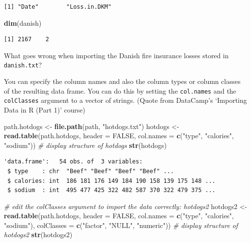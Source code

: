 \documentclass[
]{book}
\newenvironment{Shaded}{\begin{snugshade}}{\end{snugshade}}
\newcommand{\CommentTok}[1]{\textcolor[rgb]{0.56,0.35,0.01}{\textit{#1}}}
\newcommand{\DataTypeTok}[1]{\textcolor[rgb]{0.13,0.29,0.53}{#1}}
\newcommand{\KeywordTok}[1]{\textcolor[rgb]{0.13,0.29,0.53}{\textbf{#1}}}
\newcommand{\NormalTok}[1]{#1}
\newcommand{\OtherTok}[1]{\textcolor[rgb]{0.56,0.35,0.01}{#1}}
\newcommand{\StringTok}[1]{\textcolor[rgb]{0.31,0.60,0.02}{#1}}
\begin{document}
\begin{verbatim}
[1] "Date"        "Loss.in.DKM"
\end{verbatim}

\begin{Shaded}
\begin{Highlighting}[]
\KeywordTok{dim}\NormalTok{(danish)}
\end{Highlighting}
\end{Shaded}

\begin{verbatim}
[1] 2167    2
\end{verbatim}

What goes wrong when importing the Danish fire insurance losses stored in \texttt{danish.txt}?

You can specify the column names and also the column types or column classes of the resulting data frame. You can do this by setting the \texttt{col.names} and the \texttt{colClasses} argument to a vector of strings. (Quote from DataCamp's `Importing Data in R (Part 1)' course)

\begin{Shaded}
\begin{Highlighting}[]
\NormalTok{path.hotdogs <-}\StringTok{ }\KeywordTok{file.path}\NormalTok{(path, }\StringTok{"hotdogs.txt"}\NormalTok{)}
\NormalTok{hotdogs <-}\StringTok{ }\KeywordTok{read.table}\NormalTok{(path.hotdogs, }\DataTypeTok{header =} \OtherTok{FALSE}\NormalTok{, }\DataTypeTok{col.names =} \KeywordTok{c}\NormalTok{(}\StringTok{"type"}\NormalTok{, }\StringTok{"calories"}\NormalTok{, }\StringTok{"sodium"}\NormalTok{))}
\CommentTok{# display structure of hotdogs}
\KeywordTok{str}\NormalTok{(hotdogs)}
\end{Highlighting}
\end{Shaded}

\begin{verbatim}
'data.frame':	54 obs. of  3 variables:
 $ type    : chr  "Beef" "Beef" "Beef" "Beef" ...
 $ calories: int  186 181 176 149 184 190 158 139 175 148 ...
 $ sodium  : int  495 477 425 322 482 587 370 322 479 375 ...
\end{verbatim}

\begin{Shaded}
\begin{Highlighting}[]
\CommentTok{# edit the colClasses argument to import the data correctly: hotdogs2}
\NormalTok{hotdogs2 <-}\StringTok{ }\KeywordTok{read.table}\NormalTok{(path.hotdogs, }\DataTypeTok{header =} \OtherTok{FALSE}\NormalTok{, }
                       \DataTypeTok{col.names =} \KeywordTok{c}\NormalTok{(}\StringTok{"type"}\NormalTok{, }\StringTok{"calories"}\NormalTok{, }\StringTok{"sodium"}\NormalTok{),}
                       \DataTypeTok{colClasses =} \KeywordTok{c}\NormalTok{(}\StringTok{"factor"}\NormalTok{, }\StringTok{"NULL"}\NormalTok{, }\StringTok{"numeric"}\NormalTok{))}
\CommentTok{# display structure of hotdogs2}
\KeywordTok{str}\NormalTok{(hotdogs2)}
\end{Highlighting}
\end{Shaded}
\end{document}
